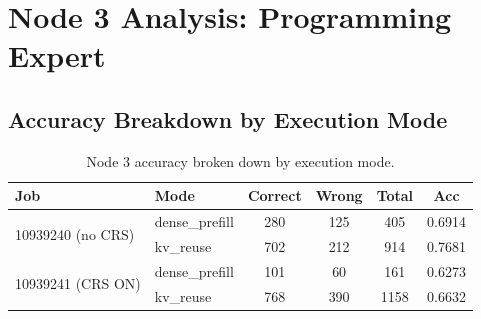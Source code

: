 \documentclass[11pt]{article}
\begin{document}
\section{Node 3 Analysis: Programming Expert}
\label{sec:node3}

\subsection{Accuracy Breakdown by Execution Mode}

\begin{table}[h]
\centering
\caption{Node 3 accuracy broken down by execution mode.}
\label{tab:node3_mode}
\begin{tabular}{llcccc}
\toprule
\textbf{Job} & \textbf{Mode} & \textbf{Correct} & \textbf{Wrong} & \textbf{Total} & \textbf{Acc} \\
\midrule
\multirow{2}{*}{10939240 (no CRS)} & dense\_prefill & 280 & 125 & 405  & 0.6914 \\
                                   & kv\_reuse      & 702 & 212 & 914  & 0.7681 \\
\midrule
\multirow{2}{*}{10939241 (CRS ON)} & dense\_prefill & 101 &  60 & 161  & 0.6273 \\
                                   & kv\_reuse      & 768 & 390 & 1158 & 0.6632 \\
\bottomrule
\end{tabular}
\end{table}
\end{document}
